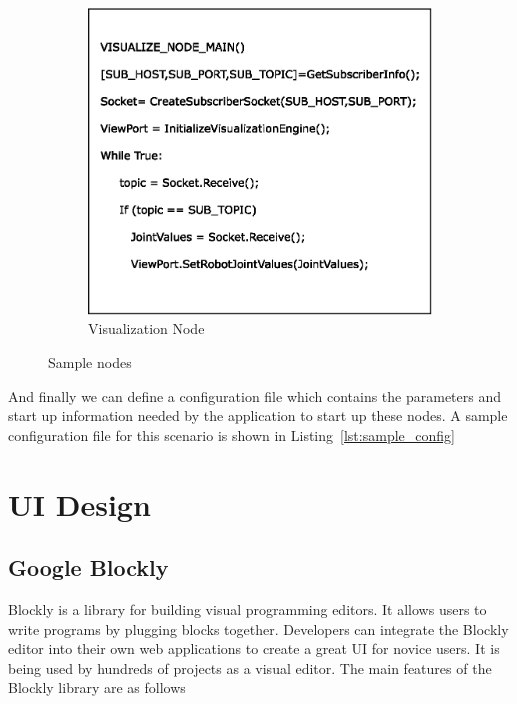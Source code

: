 \begin{figure}[H]
\begin{subfigure}[t]{0.48\textwidth}
\includegraphics[width=\textwidth]{assets/sample_node_B.eps}
\caption[Visualization Node]{Visualization Node}
\label{fig:node_b}
\end{subfigure}
\caption[Sample nodes]{Sample nodes}
\label{fig:pseudo_nodes}
\end{figure}
And finally we can define a configuration file which contains the parameters and start up information needed by the application to start up these nodes. A sample configuration file for this scenario is shown in Listing~\ref{lst:sample_config}



\section{UI Design}

\subsection{Google Blockly}
Blockly is a library for building visual programming editors. It allows users to write programs by plugging blocks together. Developers can integrate the Blockly editor into their own web applications to create a great UI for novice users. It is being used by hundreds of projects as a visual editor. The main features of the Blockly library are as follows

